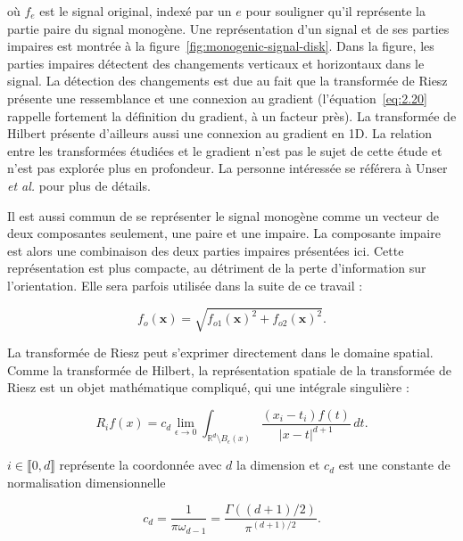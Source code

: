 \noindent où $f_e$ est le signal original, indexé par un $e$ pour souligner qu'il représente la partie paire du signal monogène. Une représentation d'un signal et de ses parties impaires est montrée à la figure~\ref{fig:monogenic-signal-disk}. Dans la figure, les parties impaires détectent des changements verticaux et horizontaux dans le signal. La détection des changements est due au fait que la transformée de Riesz présente une ressemblance et une connexion au gradient (l'équation~\ref{eq:2.20} rappelle fortement la définition du gradient, à un facteur près). La transformée de Hilbert présente d'ailleurs aussi une connexion au gradient en 1D. La relation entre les transformées étudiées et le gradient n'est pas le sujet de cette étude et n'est pas explorée plus en profondeur. La personne intéressée se référera à Unser \textit{et al.}\cite{unser_multiresolution_2009} pour plus de détails.

\bigskip

Il est aussi commun de se représenter le signal monogène comme un vecteur de deux composantes seulement, une paire et une impaire. La composante impaire est alors une combinaison des deux parties impaires présentées ici. Cette représentation est plus compacte, au détriment de la perte d'information sur l'orientation. Elle sera parfois utilisée dans la suite de ce travail :

\begin{equation}
    f_o(\mathbf{x}) = \sqrt{f_{o1}(\mathbf{x})^2 + f_{o2}(\mathbf{x})^2}.
\end{equation}

\noindent La transformée de Riesz peut s'exprimer directement dans le domaine spatial. Comme la transformée de Hilbert, la représentation spatiale de la transformée de Riesz est un objet mathématique compliqué, qui une intégrale singulière :

\begin{equation}
    R_if(x) = c_d \lim_{\epsilon \to 0}\int_{\mathbb{R}^d\setminus B_\epsilon(x)}\frac{(x_i-t_i)f(t)}{|x-t|^{d+1}}\,dt.
    \label{eq:riesz-transform-spatial}
\end{equation}

\noindent $i\in\llbracket 0, d\rrbracket$ représente la coordonnée avec $d$ la dimension et $c_d$ est une constante de normalisation dimensionnelle

\begin{equation}
    c_d = \frac1{\pi\omega_{d-1}} = \frac{\Gamma((d+1)/2)}{\pi^{(d+1)/2}}.
\end{equation}

